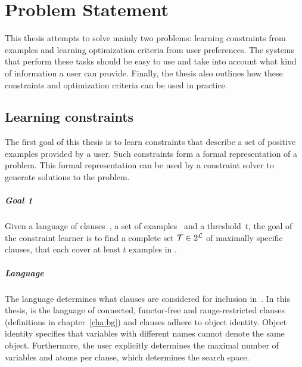\chapter{Problem Statement}
\label{cha:problem_statement}




This thesis attempts to solve mainly two problems: learning constraints from examples and learning optimization criteria from user preferences.
The systems that perform these tasks should be easy to use and take into account what kind of information a user can provide.
Finally, the thesis also outlines how these constraints and optimization criteria can be used in practice.

\section{Learning constraints}

The first goal of this thesis is to learn constraints that describe a set of positive examples provided by a user.
Such constraints form a formal representation of a problem.
This formal representation can be used by a constraint solver to generate solutions to the problem.

\label{sec:learning_constraints}

\begin{framed}
	\noindent
	\begin{minipage}{\textwidth}
		\paragraph{Goal 1}
		Given a language of clauses~, a set of examples~ and a threshold~$t$, the goal of the constraint learner is to find a complete set $\mathcal{T} \in 2^{\mathcal{L}}$ of maximally specific clauses, that each cover at least $t$ examples in .
	\end{minipage}
\end{framed}

\paragraph{Language}
The language  determines what clauses are considered for inclusion in~.
In this thesis,  is the language of connected, functor-free and range-restricted clauses (definitions in chapter~\ref{cha:bg}) and clauses adhere to object identity.
Object identity specifies that variables with different names cannot denote the same object.
Furthermore, the user explicitly determines the maximal number of variables and atoms per clause, which determines the search space.

